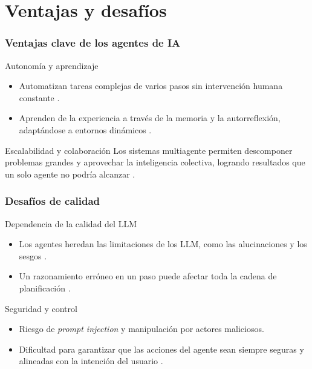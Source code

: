 \documentclass[handout]{beamer}
\begin{document}
\section{Ventajas y desafíos}
\begin{frame}
  \frametitle{Ventajas clave de los agentes de IA}
    \begin{block}{Autonomía y aprendizaje}
        \begin{itemize}
            \item Automatizan tareas complejas de varios pasos sin intervención humana constante \parencite{ferrag2025llmreasoningautonomousai}.
            \item Aprenden de la experiencia a través de la memoria y la autorreflexión, adaptándose a entornos dinámicos \parencite{plaat2025agenticlargelanguagemodels, krishnan2025aiagentsevolutionarchitecture}.
        \end{itemize}
    \end{block}
    \pause
    \begin{alertblock}{Escalabilidad y colaboración}
    Los sistemas multiagente permiten descomponer problemas grandes y aprovechar la inteligencia colectiva, logrando resultados que un solo agente no podría alcanzar \parencite{li2024survey}.
    \end{alertblock}
\end{frame}

\begin{frame}
    \frametitle{Desafíos de calidad}
    \begin{alertblock}{Dependencia de la calidad del LLM}
        \begin{itemize}
            \item Los agentes heredan las limitaciones de los LLM, como las alucinaciones y los sesgos \parencite{krishnan2025aiagentsevolutionarchitecture}.
            \item Un razonamiento erróneo en un paso puede afectar toda la cadena de planificación \parencite{huang2024understandingplanningllmagents}.
        \end{itemize}
    \end{alertblock}
    \pause
    \begin{block}{Seguridad y control}
        \begin{itemize}
            \item Riesgo de \textit{prompt injection} y manipulación por actores maliciosos.
            \item Dificultad para garantizar que las acciones del agente sean siempre seguras y alineadas con la intención del usuario \parencite{li2024personalllmagentsinsights}.
        \end{itemize}
    \end{block}
\end{frame}
\end{document}

